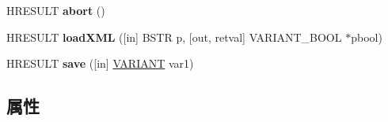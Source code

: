\begin{DoxyCompactItemize}
H\+R\+E\+S\+U\+LT {\bfseries abort} ()
\item 
\mbox{\label{interface_m_s_x_m_l2_1_1_i_x_m_l_d_o_m_document_aad034fc5a082971ba3453182f508fd54}} 
H\+R\+E\+S\+U\+LT {\bfseries load\+X\+ML} (\mbox{[}in\mbox{]} B\+S\+TR p, \mbox{[}out, retval\mbox{]} V\+A\+R\+I\+A\+N\+T\+\_\+\+B\+O\+OL $\ast$pbool)
\item 
\mbox{\label{interface_m_s_x_m_l2_1_1_i_x_m_l_d_o_m_document_ab04b05bb7a06019c1ffd3f05be74ab3b}} 
H\+R\+E\+S\+U\+LT {\bfseries save} (\mbox{[}in\mbox{]} \hyperlink{structtag_v_a_r_i_a_n_t}{V\+A\+R\+I\+A\+NT} var1)
\end{DoxyCompactItemize}
\subsection*{属性}
